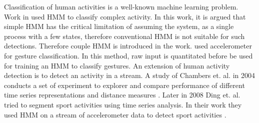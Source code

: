 Classification of human activities is a well-known machine learning problem. Work in \cite{Brand:1997wk} used HMM to classify complex activity. In this work, it is argued that simple HMM has the critical limitation of assuming the system, as a single process with a few states, therefore conventional HMM is not suitable for such detections. Therefore couple HMM is introduced in the work. \cite{Liu:2010cu} used accelerometer for gesture classification. In this method, raw input is quantitated before be used for training an HMM to classify gestures. 
An extension of human activity detection is to detect an activity in a stream. A study of Chambers et. al. in 2004 conducts a set of experiment to explorer and compare performance of different time series representations and distance measures \cite{Chambers:2004cu}. Later in 2008 Ding et. al. tried to segment sport activities using time series analysis. In their work they used HMM on a stream of accelerometer data to detect sport activities \cite{Ding:2008gq}.
